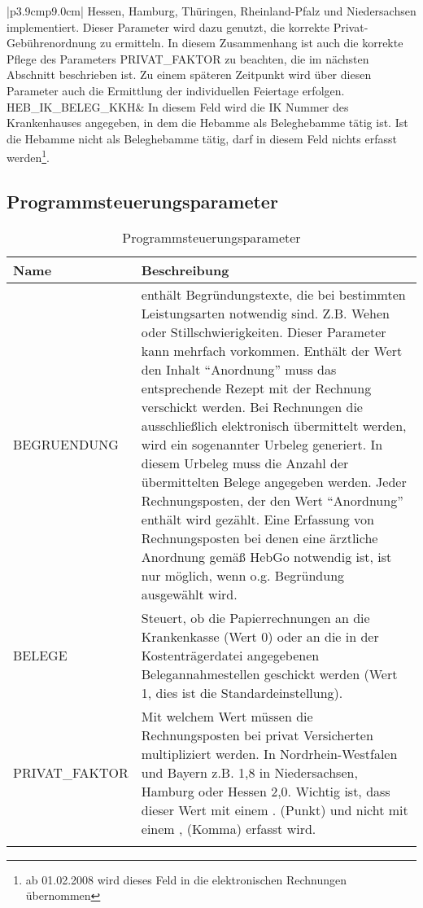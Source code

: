 \begin{mpsupertabular}{|p{3.9cm}p{9.0cm}|}
Hessen, Hamburg, Thüringen, Rheinland-Pfalz und
Niedersachsen implementiert. Dieser Parameter wird dazu genutzt, die
korrekte Privat-Gebührenordnung zu ermitteln. In diesem Zusammenhang
ist auch die korrekte Pflege des Parameters PRIVAT\_FAKTOR zu beachten,
die im nächsten Abschnitt beschrieben ist.
Zu einem späteren Zeitpunkt
wird über diesen Parameter auch die Ermittlung der individuellen
Feiertage erfolgen.
\tabularnewline\hline
HEB\_IK\_BELEG\_KKH&
In diesem Feld wird die IK Nummer des Krankenhauses angegeben, in dem die
Hebamme als Beleghebamme tätig ist. 
Ist die Hebamme nicht als Beleghebamme
tätig, darf in diesem Feld nichts erfasst werden\footnote{ab
01.02.2008 wird dieses Feld in die elektronischen Rechnungen übernommen}.
\tabularnewline\hline

\end{mpsupertabular}
 

\subsection{Programmsteuerungsparameter}\label{programmsteuerungsparameter}

\begin{table}[H]
\begin{tabular}{|p{3cm}p{11cm}|}
\firsthline
\textbf{Name}&\textbf{Beschreibung}
\tabularnewline\hline
BEGRUENDUNG&
enthält Begründungstexte, die bei bestimmten Leistungsarten notwendig
sind. Z.B. Wehen oder Stillschwierigkeiten. Dieser Parameter kann mehrfach
vorkommen. Enthält der Wert den Inhalt ``Anordnung'' muss das entsprechende
Rezept mit der Rechnung verschickt werden. Bei Rechnungen die ausschließlich
elektronisch übermittelt werden, wird ein sogenannter Urbeleg generiert. In
diesem Urbeleg muss die Anzahl der übermittelten Belege angegeben werden.
Jeder Rechnungsposten, der den Wert ``Anordnung'' enthält wird gezählt.
Eine Erfassung von Rechnungsposten bei denen eine ärztliche Anordnung
gemäß HebGo notwendig ist, ist nur möglich, wenn o.g. Begründung ausgewählt
wird.
\tabularnewline\hline
BELEGE&
Steuert, ob die Papierrechnungen an die Krankenkasse (Wert 0) oder
an die in der Kostenträgerdatei \cite{ktrdat} angegebenen 
Belegannahmestellen geschickt werden (Wert  1, dies ist die 
Standardeinstellung).
\tabularnewline\hline
PRIVAT\_FAKTOR&
Mit welchem Wert müssen die Rechnungsposten bei privat Versicherten 
\index{Privatfaktor}
multipliziert werden. In Nordrhein-Westfalen und Bayern z.B. 1,8 in 
Niedersachsen, Hamburg oder Hessen 2,0. Wichtig ist,
dass dieser Wert mit einem . (Punkt) und nicht mit einem , (Komma)
erfasst wird.
\tabularnewline\hline
\lasthline
\end{tabular}
\caption{Programmsteuerungsparameter\label{programmsteuerung_parm}}
\end{table}



